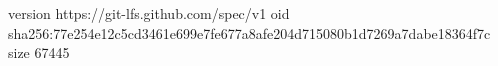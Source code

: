 version https://git-lfs.github.com/spec/v1
oid sha256:77e254e12c5cd3461e699e7fe677a8afe204d715080b1d7269a7dabe18364f7c
size 67445
